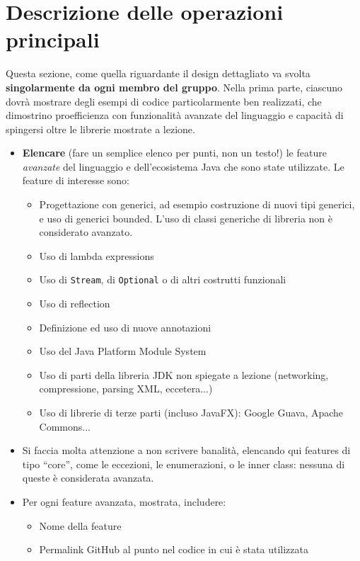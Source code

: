 \documentclass[a4paper,12pt]{report}
\begin{document}
\section{Descrizione delle operazioni principali}

Questa sezione, come quella riguardante il design dettagliato va svolta \textbf{singolarmente da ogni membro del gruppo}.
%
Nella prima parte, ciascuno dovrà mostrare degli esempi di codice particolarmente ben realizzati,
che dimostrino proefficienza con funzionalità avanzate del linguaggio e capacità di spingersi oltre le librerie mostrate a lezione.

\begin{itemize}
	\item \textbf{Elencare} (fare un semplice elenco per punti, non un testo!) le feature \textit{avanzate} del linguaggio e dell'ecosistema Java che sono state
utilizzate. Le feature di interesse sono:
	\begin{itemize}
		\item Progettazione con generici, ad esempio costruzione di nuovi tipi generici, e uso di generici bounded.
		L'uso di classi generiche di libreria non è considerato avanzato.
		\item Uso di lambda expressions
		\item Uso di \texttt{Stream}, di \texttt{Optional} o di altri costrutti funzionali
		\item Uso di reflection
		\item Definizione ed uso di nuove annotazioni
		\item Uso del Java Platform Module System
		\item Uso di parti della libreria JDK non spiegate a lezione (networking, compressione, parsing XML, eccetera...)
		\item Uso di librerie di terze parti (incluso JavaFX): Google Guava, Apache Commons...
	\end{itemize}
	\item Si faccia molta attenzione a non scrivere banalità, elencando qui features di tipo ``core'', come le eccezioni, le enumerazioni, o le inner class: nessuna di queste è considerata avanzata.
	\item Per ogni feature avanzata, mostrata, includere:
	\begin{itemize}
		\item Nome della feature
		\item Permalink GitHub al punto nel codice in cui è stata utilizzata
	\end{itemize}
\end{itemize}
\end{document}
